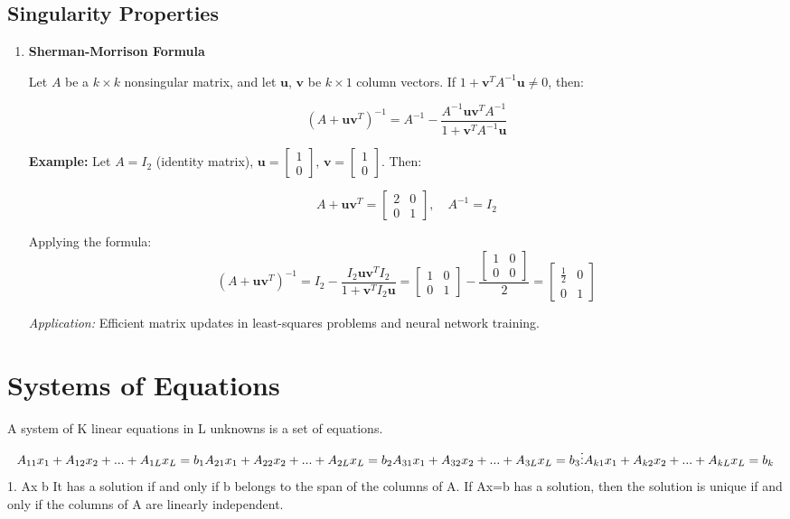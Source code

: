 \documentclass{article}
\begin{document}
\subsection{Singularity Properties}
\begin{enumerate}
    \item \textbf{Sherman-Morrison Formula}
    
    Let \( A \) be a \( k \times k \) nonsingular matrix, and let \( \mathbf{u} \), \( \mathbf{v} \) be \( k \times 1 \) column vectors. 
    If \( 1 + \mathbf{v}^T A^{-1} \mathbf{u} \neq 0 \), then:
    
    \[
    \left( A + \mathbf{u}\mathbf{v}^T \right)^{-1} = A^{-1} - \frac{A^{-1} \mathbf{u}\mathbf{v}^T A^{-1}}{1 + \mathbf{v}^T A^{-1} \mathbf{u}}
    \]
    
    \textbf{Example:} Let \( A = I_2 \) (identity matrix), \( \mathbf{u} = \begin{bmatrix} 1 \\ 0 \end{bmatrix} \), \( \mathbf{v} = \begin{bmatrix} 1 \\ 0 \end{bmatrix} \). Then:
    
    \[
    A + \mathbf{u}\mathbf{v}^T = \begin{bmatrix} 2 & 0 \\ 0 & 1 \end{bmatrix}, \quad
    A^{-1} = I_2
    \]
    
    Applying the formula:
    \[
    \left( A + \mathbf{u}\mathbf{v}^T \right)^{-1} = I_2 - \frac{I_2 \mathbf{u}\mathbf{v}^T I_2}{1 + \mathbf{v}^T I_2 \mathbf{u}} 
    = \begin{bmatrix} 1 & 0 \\ 0 & 1 \end{bmatrix} - \frac{\begin{bmatrix} 1 & 0 \\ 0 & 0 \end{bmatrix}}{2} 
    = \begin{bmatrix} \frac{1}{2} & 0 \\ 0 & 1 \end{bmatrix}
    \]
    
    \textit{Application:} Efficient matrix updates in least-squares problems and neural network training.
\end{enumerate}
\date{\today}
\section{Systems of Equations}
A system of K linear equations in L unknowns is a set of equations.
$$
A_{11}x_1 + A_{12}x_2 + ... + A_{1L}x_L = b_1 \\
A_{21}x_1 + A_{22}x_2 + ... + A_{2L}x_L = b_2 \\
A_{31}x_1 + A_{32}x_2 + ... + A_{3L}x_L = b_3 \\
\vdots
A_{k1}x_1 + A_{k2}x_2 + ... + A_{kL}x_L = b_k
$$
1. Ax \rightarrowfill b \rightarrowfill It has a solution if and only if b belongs
to the span of the columns of A. If Ax=b has a solution, then the solution is unique
if and only if the columns of A are linearly independent.
\end{document}

